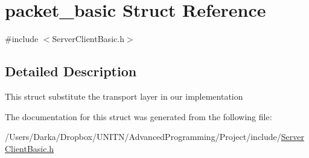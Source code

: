 \hypertarget{structpacket__basic}{}\section{packet\+\_\+basic Struct Reference}
\label{structpacket__basic}


{\ttfamily \#include $<$Server\+Client\+Basic.\+h$>$}



\subsection{Detailed Description}
This struct substitute the transport layer in our implementation 

The documentation for this struct was generated from the following file\+:\begin{DoxyCompactItemize}
\item 
/\+Users/\+Darka/\+Dropbox/\+U\+N\+I\+T\+N/\+Advanced\+Programming/\+Project/include/\hyperlink{_server_client_basic_8h}{Server\+Client\+Basic.\+h}\end{DoxyCompactItemize}
